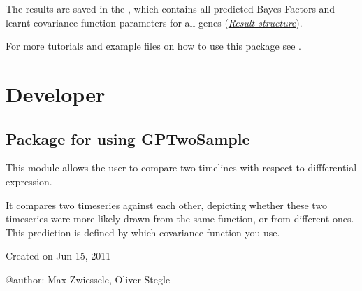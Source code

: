 \documentclass[letterpaper,10pt,english]{sphinxmanual}
\begin{document}
The results are saved in the , which contains all
predicted Bayes Factors and learnt covariance function parameters for
all genes ({\hyperref[results:results]{\emph{Result structure}}}).

For more tutorials and example files on how to use this package see
.


\chapter{Developer}
\label{index:developer}\label{base:module-gptwosample}

\section{Package for using GPTwoSample}
\label{base:package-for-using-gptwosample}\label{base::doc}
This module allows the user to compare two timelines with respect to diffferential expression.

It compares two timeseries against each other, depicting whether these two
timeseries were more likely drawn from the same function, or from
different ones. This prediction is defined by which covariance function  you use.

Created on Jun 15, 2011

@author: Max Zwiessele, Oliver Stegle
\end{document}
